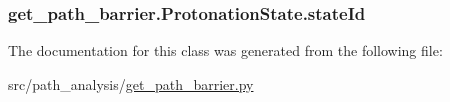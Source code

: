 \hypertarget{classget__path__barrier_1_1_protonation_state_a0887568cf1ad7ef61b03b9e9e0438186}{
\subsubsection[{state\-Id}]{\setlength{\rightskip}{0pt plus 5cm}get\-\_\-path\-\_\-barrier.\-Protonation\-State.\-state\-Id}}\label{classget__path__barrier_1_1_protonation_state_a0887568cf1ad7ef61b03b9e9e0438186}


The documentation for this class was generated from the following file\-:\begin{DoxyCompactItemize}
\item 
src/path\-\_\-analysis/\hyperlink{get__path__barrier_8py}{get\-\_\-path\-\_\-barrier.\-py}\end{DoxyCompactItemize}
